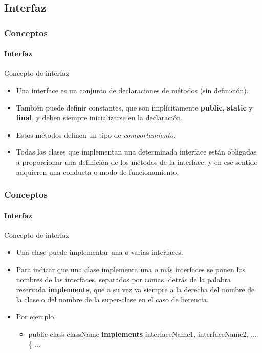 \documentclass{beamer}
\begin{document}
		\subsection{Interfaz}

		\begin{frame}
			\frametitle{Conceptos}
			\framesubtitle{Interfaz}

			\begin{block}{Concepto de interfaz}
				\begin{itemize}
  					\item Una interface es un conjunto de declaraciones de m\'etodos (sin definici\'on). 
					\item Tambi\'en puede definir constantes, que son impl\'icitamente \textbf{public}, \textbf{static} y \textbf{final}, y deben siempre inicializarse en la declaraci\'on.
					\item Estos m\'etodos definen un tipo de {\em comportamiento}.
					\item Todas las clases que implementan una determinada interface est\'an obligadas a proporcionar una definici\'on de los m\'etodos de la interface, y en ese sentido adquieren una conducta o modo de funcionamiento.
				\end{itemize}
			\end{block}
		\end{frame}

		\begin{frame}
			\frametitle{Conceptos}
			\framesubtitle{Interfaz}

			\begin{block}{Concepto de interfaz}
				\begin{itemize}
  					\item Una clase puede implementar una o varias interfaces. 
					\item Para indicar que una clase implementa una o m\'as interfaces se ponen los nombres de las interfaces, separados por comas, detr\'as de la palabra reservada \textbf{implements}, que a su vez va siempre a la derecha del nombre de la clase o del nombre de la super-clase en el caso de herencia. 
					\item Por ejemplo,
					\begin{itemize}
  						\item public class className \textbf{implements} interfaceName1, interfaceName2, ... \{ ...
					\end{itemize}	
				\end{itemize}
			\end{block}
		\end{frame}
\end{document}
